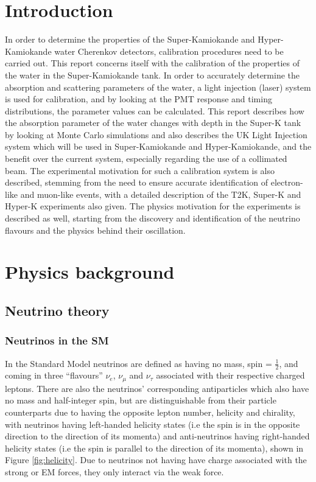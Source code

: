 \documentclass[11pt,oneside,a4paper]{article}
\begin{document}
\section{Introduction}
In order to determine the properties of the Super-Kamiokande and Hyper-Kamiokande water Cherenkov detectors, calibration procedures need to be carried out. This report concerns itself with the calibration of the properties of the water in the Super-Kamiokande tank. In order to accurately determine the absorption and scattering parameters of the water, a light injection (laser) system is used for calibration, and by looking at the PMT response and timing distributions, the parameter values can be calculated. This report describes how the absorption parameter of the water changes with depth in the Super-K tank by looking at Monte Carlo simulations and also describes the UK Light Injection system which will be used in Super-Kamiokande and Hyper-Kamiokande, and the benefit over the current system, especially regarding the use of a collimated beam. The experimental motivation for such a calibration system is also described, stemming from the need to ensure accurate identification of electron-like and muon-like events, with a detailed description of the T2K, Super-K and Hyper-K experiments also given. The physics motivation for the experiments is described as well, starting from the discovery and identification of the neutrino flavours and the physics behind their oscillation.


\section{Physics background}

\subsection{Neutrino theory}

\subsubsection{Neutrinos in the SM}
In the Standard Model neutrinos are defined as having no mass, spin = $\frac{1}{2}$, and coming in three ``flavours'' ${\nu}_{e}$, ${\nu}_{\mu}$ and ${\nu}_{\tau}$ associated with their respective charged leptons. There are also the neutrinos' corresponding antiparticles which also have no mass and half-integer spin, but are distinguishable from their particle counterparts due to having the opposite lepton number, helicity and chirality, with neutrinos having left-handed helicity states (i.e the spin is in the opposite direction to the direction of its momenta) and anti-neutrinos having right-handed helicity states (i.e the spin is parallel to the direction of its momenta), shown in Figure \ref{fig:helicity}. Due to neutrinos not having have charge associated with the strong or EM forces, they only interact via the weak force. 
\end{document}
